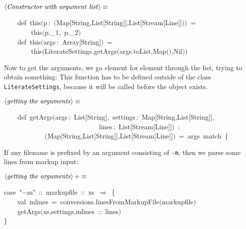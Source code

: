 \documentclass[a4paper,12pt]{article}
\begin{document}
$\left<\mbox{\emph{Constructor with argument list}}\right>\equiv$
\begin{program}~~~~{\vem def}~{\vem this}$($p\,{\rm :}~$($Map$[$String,List$[$String$]$$]$,List$[$Stream$[$Line$]$$]$$)$$)$~=
\\~~~~~~~~{\vem this}$($p.\_1,~p.\_2$)$
\\[0.5em]~~~~{\vem def}~{\vem this}$($args\,{\rm :}~Array$[$String$]$$)$~=
\\~~~~~~~~{\vem this}$($LiterateSettings.getArgs$($args.toList,Map$($$)$,Nil$)$$)$
\\[0.5em]\end{program}



Now to get the arguments, we go element for element through
the list, trying to obtain something: This function has to be defined
outside of the class \texttt{LiterateSettings}, because it will be called
before the object exists.

$\left<\mbox{\emph{getting the arguments}}\right>\equiv$
\begin{program}~~~~{\vem def}~getArgs$($args\,{\rm :}~List$[$String$]$,~settings\,{\rm :}~Map$[$String,List$[$String$]$$]$,
\\~~~~~~~~~~~~~~~~~~~~~~~~~~~~lines\,{\rm :}~List$[$Stream$[$Line$]$$]$$)$~{\rm :}
\\~~~~~~~~~~~~$($Map$[$String,List$[$String$]$$]$,List$[$Stream$[$Line$]$$]$$)$~=~args~{\vem match}~{\small\{}
\\[0.5em]\end{program}



If any filename is prefixed by an argument consisting of \texttt{-m},
then we parse some lines from markup input:

$\left<\mbox{\emph{getting the arguments}}\right>+\equiv$
\begin{program}{\vem case}~"$-$m"~{\rm :}{\rm :}~markupfile~{\rm :}{\rm :}~xs~$\Rightarrow$~{\small\{}
\\~~~~{\vem val}~mlines~=~conversions.linesFromMarkupFile$($markupfile$)$
\\~~~~getArgs$($xs,settings,mlines~{\rm :}{\rm :}~lines$)$
\\{\small\}}
\\[0.5em]\end{program}
\end{document}
